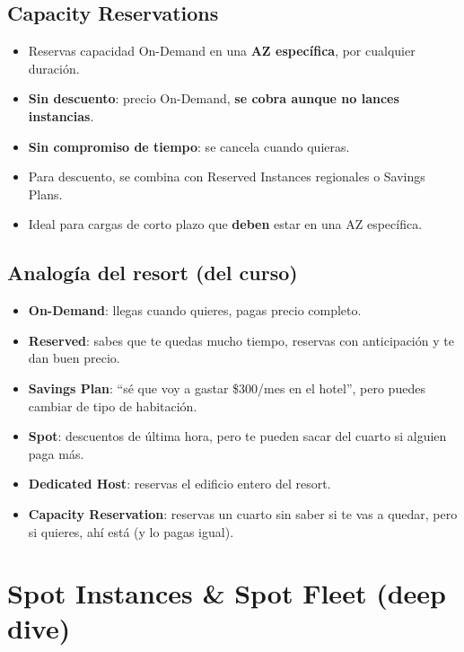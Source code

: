 \documentclass[11pt,a4paper]{article}
\let\oldsection\section
\renewcommand{\section}{\Needspace{9\baselineskip}\oldsection}
\let\oldsubsection\subsection
\renewcommand{\subsection}{\Needspace{6\baselineskip}\oldsubsection}
\begin{document}
\subsection{Capacity Reservations}
\begin{itemize}
  \item Reservas capacidad On-Demand en una \textbf{AZ específica}, por cualquier duración.
  \item \textbf{Sin descuento}: precio On-Demand, \textbf{se cobra aunque no lances instancias}.
  \item \textbf{Sin compromiso de tiempo}: se cancela cuando quieras.
  \item Para descuento, se combina con Reserved Instances regionales o Savings Plans.
  \item Ideal para cargas de corto plazo que \textbf{deben} estar en una AZ específica.
\end{itemize}

\subsection{Analogía del resort (del curso)}
\begin{itemize}
  \item \textbf{On-Demand}: llegas cuando quieres, pagas precio completo.
  \item \textbf{Reserved}: sabes que te quedas mucho tiempo, reservas con anticipación y te dan buen precio.
  \item \textbf{Savings Plan}: ``sé que voy a gastar \$300/mes en el hotel'', pero puedes cambiar de tipo de habitación.
  \item \textbf{Spot}: descuentos de última hora, pero te pueden sacar del cuarto si alguien paga más.
  \item \textbf{Dedicated Host}: reservas el edificio entero del resort.
  \item \textbf{Capacity Reservation}: reservas un cuarto sin saber si te vas a quedar, pero si quieres, ahí está (y lo pagas igual).
\end{itemize}

\section{Spot Instances \& Spot Fleet (deep dive)}
\end{document}
